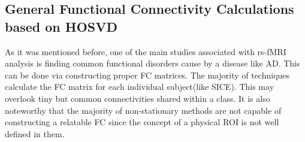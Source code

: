 \documentclass[preprint,12pt]{elsarticle}
\begin{document}
\subsection{General Functional Connectivity Calculations based on HOSVD} \label{FC_Construction}


As it was mentioned before, one of the main studies associated with rs-fMRI analysis is finding common functional disorders cause by a disease like AD. This can be done via constructing proper FC matrices. The majority of techniques calculate the FC matrix for each individual subject(like SICE). This may overlook tiny but common connectivities shared within a class. It is also noteworthy that the majority of non-stationary methods are not capable of constructing a relatable FC since the concept of a physical ROI is not well defined in them.    


%	

\end{document}
